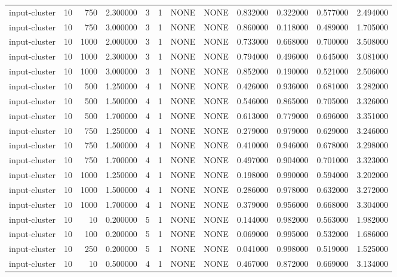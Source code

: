 \begin{tabular}{lrrrllllrrrr}
input-cluster & 10 & 750 & 2.300000 & 3 & 1 & NONE & NONE & 0.832000 & 0.322000 & 0.577000 & 2.494000 \\
input-cluster & 10 & 750 & 3.000000 & 3 & 1 & NONE & NONE & 0.860000 & 0.118000 & 0.489000 & 1.705000 \\
input-cluster & 10 & 1000 & 2.000000 & 3 & 1 & NONE & NONE & 0.733000 & 0.668000 & 0.700000 & 3.508000 \\
input-cluster & 10 & 1000 & 2.300000 & 3 & 1 & NONE & NONE & 0.794000 & 0.496000 & 0.645000 & 3.081000 \\
input-cluster & 10 & 1000 & 3.000000 & 3 & 1 & NONE & NONE & 0.852000 & 0.190000 & 0.521000 & 2.506000 \\
input-cluster & 10 & 500 & 1.250000 & 4 & 1 & NONE & NONE & 0.426000 & 0.936000 & 0.681000 & 3.282000 \\
input-cluster & 10 & 500 & 1.500000 & 4 & 1 & NONE & NONE & 0.546000 & 0.865000 & 0.705000 & 3.326000 \\
input-cluster & 10 & 500 & 1.700000 & 4 & 1 & NONE & NONE & 0.613000 & 0.779000 & 0.696000 & 3.351000 \\
input-cluster & 10 & 750 & 1.250000 & 4 & 1 & NONE & NONE & 0.279000 & 0.979000 & 0.629000 & 3.246000 \\
input-cluster & 10 & 750 & 1.500000 & 4 & 1 & NONE & NONE & 0.410000 & 0.946000 & 0.678000 & 3.298000 \\
input-cluster & 10 & 750 & 1.700000 & 4 & 1 & NONE & NONE & 0.497000 & 0.904000 & 0.701000 & 3.323000 \\
input-cluster & 10 & 1000 & 1.250000 & 4 & 1 & NONE & NONE & 0.198000 & 0.990000 & 0.594000 & 3.202000 \\
input-cluster & 10 & 1000 & 1.500000 & 4 & 1 & NONE & NONE & 0.286000 & 0.978000 & 0.632000 & 3.272000 \\
input-cluster & 10 & 1000 & 1.700000 & 4 & 1 & NONE & NONE & 0.379000 & 0.956000 & 0.668000 & 3.304000 \\
input-cluster & 10 & 10 & 0.200000 & 5 & 1 & NONE & NONE & 0.144000 & 0.982000 & 0.563000 & 1.982000 \\
input-cluster & 10 & 100 & 0.200000 & 5 & 1 & NONE & NONE & 0.069000 & 0.995000 & 0.532000 & 1.686000 \\
input-cluster & 10 & 250 & 0.200000 & 5 & 1 & NONE & NONE & 0.041000 & 0.998000 & 0.519000 & 1.525000 \\
input-cluster & 10 & 10 & 0.500000 & 4 & 1 & NONE & NONE & 0.467000 & 0.872000 & 0.669000 & 3.134000 \\

\end{tabular}

